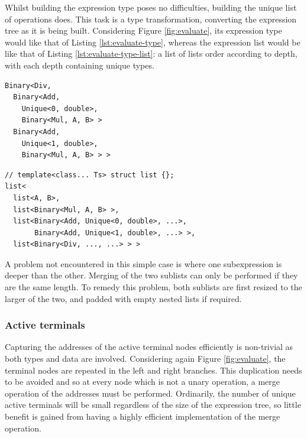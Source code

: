 \documentclass[a4paper,10pt]{article}
\begin{document}
Whilst building the expression type poses no difficulties, building the unique list of operations does. This task is a type transformation, converting the expression tree as it is being built. Considering Figure \ref{fig:evaluate}, its expression type would like that of Listing \ref{lst:evaluate-type}, whereas the expression list would be like that of Listing \ref{lst:evaluate-type-list}: a list of lists order according to depth, with each depth containing unique types.\newline
\begin{minipage}{\linewidth}
  \centering
  \begin{minipage}{0.45\linewidth}
\begin{lstlisting}[caption={Expression type of Figure \ref{fig:evaluate}.}, label=lst:evaluate-type]
Binary<Div,
  Binary<Add,
    Unique<0, double>,
    Binary<Mul, A, B> >
  Binary<Add,
    Unique<1, double>,
    Binary<Mul, A, B> > >
\end{lstlisting}
  \end{minipage}
  \hspace{0.05\linewidth}
  \begin{minipage}{0.45\linewidth}
    \begin{lstlisting}[caption={Expression type list of Figure \ref{fig:evaluate}.}, label=lst:evaluate-type-list]
// template<class... Ts> struct list {};
list<
  list<A, B>,
  list<Binary<Mul, A, B> >,
  list<Binary<Add, Unique<0, double>, ...>,
       Binary<Add, Unique<1, double>, ...> >,
  list<Binary<Div, ..., ...> > >
\end{lstlisting}
  \end{minipage}
\end{minipage}

A problem not encountered in this simple case is where one subexpression is deeper than the other. Merging of the two sublists can only be performed if they are the same length. To remedy this problem, both sublists are first resized to the larger of the two, and padded with empty nested lists if required.

\subsubsection{Active terminals}
Capturing the addresses of the active terminal nodes efficiently is non-trivial as both types and data are involved. Considering again Figure \ref{fig:evaluate}, the terminal nodes are repeated in the left and right branches. This duplication needs to be avoided and so at every node which is not a unary operation, a merge operation of the addresses must be performed. Ordinarily, the number of unique active terminals will be small regardless of the size of the expression tree, so little benefit is gained from having a highly efficient implementation of the merge operation.
\end{document}
